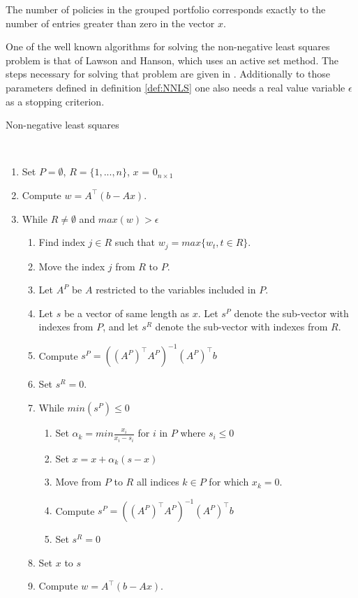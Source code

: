 \begin{remark}
	The number of policies in the grouped portfolio corresponds exactly to the number of entries greater than zero in the vector $x$.
\end{remark}

One of the well known algorithms for solving the non-negative least squares problem is that of Lawson and Hanson, which uses an active set method. The steps necessary for solving that problem are given in \cite{lawson}. Additionally to those parameters defined in definition \ref{def:NNLS} one also needs a real value variable $\epsilon$ as a stopping criterion.

\begin{algorithm}
	\caption{Non-negative least squares \cite{lawson}}\label{alg:NNLS}
	\begin{algorithmic}
		\\
		\begin{enumerate}
			\item Set $P = \emptyset$, $R = \{1, ..., n\}$, $x$ = $0_{n \times 1}$
			\item Compute $w = A^\top(b - Ax)$.
			\item While $R \neq \emptyset$ and $max(w) > \epsilon$
			\begin{enumerate}[label=\emph{\alph*})]
				\item Find index $j \in R$ such that $w_j = max\{w_t, t \in R\}$.
				\item Move the index $j$ from $R$ to $P$.
				\item Let $A^P$ be $A$ restricted to the variables included in $P$.
				\item Let $s$ be a vector of same length as $x$. Let $s^P$ denote the sub-vector with indexes from $P$, and let $s^R$ denote the sub-vector with indexes from $R$.
				\item Compute $s^P = ((A^P)^\top A^P)^{-1} (A^P)^\top b$
				\item Set $s^R = 0$.
				\item While $min(s^P) \leq 0$
				\begin{enumerate}
					\item Set $\alpha_k = min\frac{x_i}{x_i - s_i}$ for $i$ in $P$ where $s_i \leq 0$
					\item Set $x = x + \alpha_k(s-x)$
					\item Move from $P$ to $R$ all indices $k \in P$ for which $x_k = 0$.
					\item Compute $s^P = ((A^P)^\top A^P)^{-1} (A^P)^\top b$
					\item Set $s^R = 0$
				\end{enumerate}
				\item Set $x$ to $s$
				\item Compute $w = A^\top(b - Ax)$.
			\end{enumerate}
		\end{enumerate}
	\end{algorithmic}
\end{algorithm}

